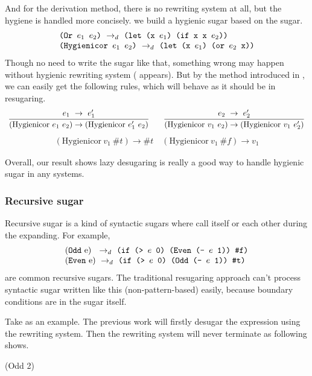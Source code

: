 And for the derivation method, there is no rewriting system at all, but the hygiene is handled more concisely. we build a hygienic sugar  based on the  sugar.
\[
\begin{array}{l}
\texttt{(Or $e_1$ $e_2$)} ~\rightarrow_d~ \texttt{(let (x $e_1$) (if x x $e_2$))}\\
\texttt{(Hygienicor $e_1$ $e_2$)} ~\rightarrow_d~ \texttt{(let (x $e_1$) (or $e_2$ x))}
\end{array}
\]
Though no need to write the sugar like that, something wrong may happen without hygienic rewriting system ( appears). But by the method introduced in , we can easily get the following rules, which will behave as it should be in resugaring.
\[
\begin{array}{c}
\infer {(\mbox{Hygienicor}~e_1~e_2) \rightarrow (\mbox{Hygienicor}~e_1'~e_2)} {e_1~ \rightarrow~e_1'}
\qquad
\infer {(\mbox{Hygienicor}~v_1~e_2) \rightarrow (\mbox{Hygienicor}~v_1~e_2')} {e_2~ \rightarrow~e_2'}
\end{array}\]
\[
\begin{array}{c}
(\mbox{Hygienicor}~v_1~\#t) \rightarrow \#t
\quad
(\mbox{Hygienicor}~v_1~\#f) \rightarrow v_1
\end{array}
\]

Overall, our result shows lazy desugaring is really a good way to handle hygienic sugar in any systems.

\subsubsection{Recursive sugar}
\label{sec:recursiveSugar}

Recursive sugar is a kind of syntactic sugars where call itself or each other during the expanding. For example,
\[
\begin{array}{l}
\drule{(\m{Odd}~$e$)~}{\Code{(if (> $e$ 0) (Even (- $e$ 1)) \false)}}\\
\drule{(\m{Even}~$e$)}{\Code{(if (> $e$ 0) (Odd (- $e$ 1)) \true)}}
\end{array}
\]
are common recursive sugars. The traditional resugaring approach can't process syntactic sugar written like this (non-pattern-based) easily, because boundary conditions are in the sugar itself.

Take  as an example. The previous work will firstly desugar the expression using the rewriting system. Then the rewriting system will never terminate as following shows.
\begin{small}
\begin{Codes}
   (Odd 2)
\end{Codes}
\end{small}



